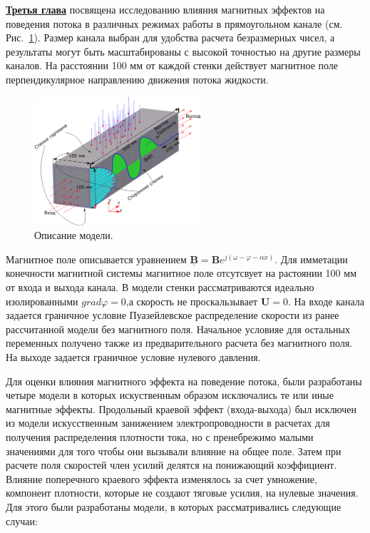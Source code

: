 \underline{\textbf{Третья глава}} посвящена исследованию влияния магнитных эффектов на поведения потока в различных режимах работы в прямоугольном канале  (см. Рис.~\ref{fig:model}). Размер канала выбран для удобства расчета безразмерных чисел, а результаты могут быть масштабированы с высокой точностью на другие размеры каналов.  На расстоянии 100 мм от каждой стенки действует магнитное поле перпендикулярное направлению движения потока жидкости. 
\begin{figure}
	\centering
	\includegraphics[width=0.55\textwidth]{Synopsis/images/part3/Description_ru.png}
	\caption{Описание модели.}
	\label{fig:model}	
\end{figure}
Магнитное поле описывается уравнением $\underline{\mathbf{B}} = \mathbf{B} e^{j(\omega - \varphi - \alpha x)}$. Для имметации конечности магнитной системы магнитное поле отсутсвует на растоянии 100 мм от входа и выхода канала. В модели стенки рассматриваются идеально изолированными $grad \varphi = 0$,а скорость не проскальзывает $\mathbf{U} = 0$. На входе канала задается граничное условие Пуазейлевское распределение скорости из ранее рассчитанной модели без магнитного поля. Начальное условияе для остальных переменных получено также из предварительного расчета без магнитного поля. На выходе задается граничное условие нулевого давления.  

Для оценки влияния магнитного эффекта на поведение потока, были разработаны четыре модели в которых искуственным образом исключались те или иные магнитные эффекты. 
Продольный краевой эффект (входа-выхода) был исключен из модели искусственным занижением электропроводности в расчетах для получения распределения плотности тока, но с пренебрежимо малыми значениями для того чтобы  они вызывали влияние на общее поле. Затем при расчете поля скоростей член усилий делятся на понижающий коэффициент. Влияние поперечного краевого эффекта изменялось за счет умножение, компонент плотности, которые не создают тяговые усилия, на нулевые значения. Для этого были разработаны модели, в которых рассматривались следующие случаи:

